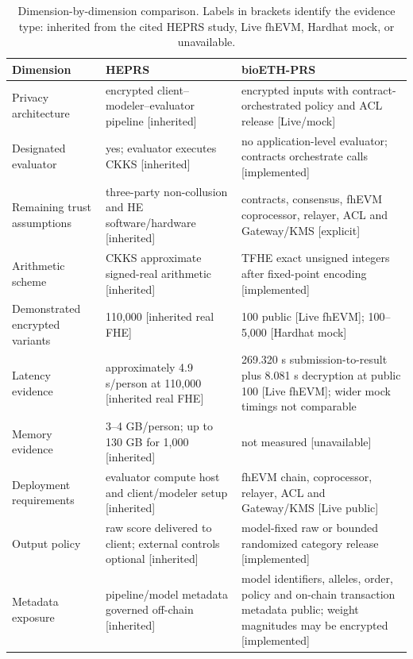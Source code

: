 \documentclass[10pt,twocolumn]{article}
\begin{document}
\begin{table}[t]
\centering
\caption{Dimension-by-dimension comparison.  Labels in brackets identify the evidence
type: inherited from the cited HEPRS study, Live fhEVM, Hardhat mock, or unavailable.}
\label{tab:comparison}
\footnotesize
\setlength{\tabcolsep}{4pt}
\begin{tabularx}{\textwidth}{@{}p{3.1cm}XX@{}}
\toprule
\textbf{Dimension} & \textbf{HEPRS} \citep{knight2026heprs} & \textbf{bioETH-PRS} \\
\midrule
Privacy architecture & encrypted client--modeler--evaluator pipeline [inherited] & encrypted inputs with contract-orchestrated policy and ACL release [Live/mock] \\
Designated evaluator & yes; evaluator executes CKKS [inherited] & no application-level evaluator; contracts orchestrate calls [implemented] \\
Remaining trust assumptions & three-party non-collusion and HE software/hardware [inherited] & contracts, consensus, fhEVM coprocessor, relayer, ACL and Gateway/KMS [explicit] \\
Arithmetic scheme & CKKS approximate signed-real arithmetic [inherited] & TFHE exact unsigned integers after fixed-point encoding [implemented] \\
Demonstrated encrypted variants & 110,000 [inherited real FHE] & 100 public [Live fhEVM]; 100--5,000 [Hardhat mock] \\
Latency evidence & approximately 4.9 s/person at 110,000 [inherited real FHE] & 269.320 s submission-to-result plus 8.081 s decryption at public 100 [Live fhEVM]; wider mock timings not comparable \\
Memory evidence & 3--4 GB/person; up to 130 GB for 1,000 [inherited] & not measured [unavailable] \\
Deployment requirements & evaluator compute host and client/modeler setup [inherited] & fhEVM chain, coprocessor, relayer, ACL and Gateway/KMS [Live public] \\
Output policy & raw score delivered to client; external controls optional [inherited] & model-fixed raw or bounded randomized category release [implemented] \\
Metadata exposure & pipeline/model metadata governed off-chain [inherited] & model identifiers, alleles, order, policy and on-chain transaction metadata public; weight magnitudes may be encrypted [implemented] \\
\bottomrule
\end{tabularx}
\end{table}
\end{document}

